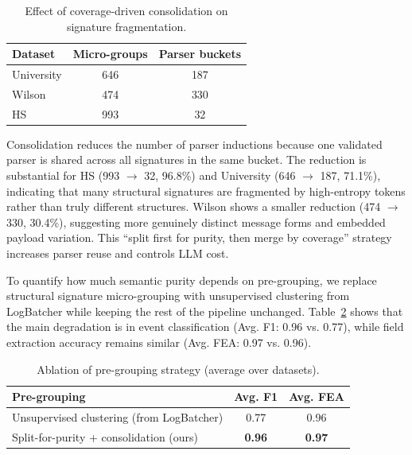 \documentclass[journal]{IEEEtran}
\begin{document}
\begin{table}[!t]
	\centering
	\caption{Effect of coverage-driven consolidation on signature fragmentation.}
	\label{tab:consolidation}
	\begin{tabular}{lcc}
		\toprule
		\textbf{Dataset} & \textbf{Micro-groups} & \textbf{Parser buckets} \\
		\midrule
		University       & 646                   & 187                     \\
		Wilson           & 474                   & 330                     \\
		HS               & 993                   & 32                      \\
		\bottomrule
	\end{tabular}
\end{table}

Consolidation reduces the number of parser inductions because one validated parser is shared across all signatures in the same bucket. The reduction is substantial for HS (993 $\rightarrow$ 32, 96.8\%) and University (646 $\rightarrow$ 187, 71.1\%), indicating that many structural signatures are fragmented by high-entropy tokens rather than truly different structures. Wilson shows a smaller reduction (474 $\rightarrow$ 330, 30.4\%), suggesting more genuinely distinct message forms and embedded payload variation. This ``split first for purity, then merge by coverage'' strategy increases parser reuse and controls LLM cost.

To quantify how much semantic purity depends on pre-grouping, we replace structural signature micro-grouping with unsupervised clustering from LogBatcher while keeping the rest of the pipeline unchanged. Table~\ref{tab:ablation_grouping} shows that the main degradation is in event classification (Avg. F1: 0.96 vs. 0.77), while field extraction accuracy remains similar (Avg. FEA: 0.97 vs. 0.96).

\begin{table}[!t]
	\centering
	\caption{Ablation of pre-grouping strategy (average over datasets).}
	\label{tab:ablation_grouping}
	\begin{tabular}{lcc}
		\toprule
		\textbf{Pre-grouping}                     & \textbf{Avg. F1} & \textbf{Avg. FEA} \\
		\midrule
		Unsupervised clustering (from LogBatcher) & 0.77             & 0.96              \\
		Split-for-purity + consolidation (ours)   & \textbf{0.96}    & \textbf{0.97}     \\
		\bottomrule
	\end{tabular}
\end{table}
\end{document}
